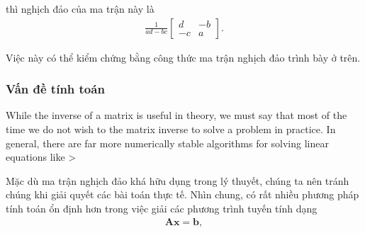 \documentclass[letterpaper,11pt,english]{sphinxmanual}
\begin{document}
thì nghịch đảo của ma trận này là
\begin{equation}\label{equation:chapter_appendix_math/geometry-linear-algebric-ops_vn:chapter_appendix_math/geometry-linear-algebric-ops_vn:21}
\begin{split} \frac{1}{ad-bc}  \begin{bmatrix}
d & -b \\
-c & a
\end{bmatrix}.\end{split}
\end{equation}


Việc này có thể kiểm chứng bằng công thức ma trận nghịch đảo trình bày ở
trên.

\begin{sphinxVerbatim}[commandchars=\\\{\}]
  \PYG{p}{[}\PYG{p}{[} \PYG{p}{]} \PYG{p}{[} \PYG{p}{]}\PYG{p}{]}
  \PYG{p}{[}\PYG{p}{[} \PYG{p}{]} \PYG{p}{[} \PYG{p}{]}\PYG{p}{]}
\end{sphinxVerbatim}








\subsubsection{Vấn đề tính toán}
\label{\detokenize{chapter_appendix_math/geometry-linear-algebric-ops_vn:van-de-tinh-toan}}
While the inverse of a matrix is useful in theory, we must say that most
of the time we do not wish to  the matrix inverse to solve a
problem in practice. In general, there are far more numerically stable
algorithms for solving linear equations like \textendash{}\textgreater{}

Mặc dù ma trận nghịch đảo khá hữu dụng trong lý thuyết, chúng ta nên
tránh  chúng khi giải quyết các bài toán thực tế. Nhìn chung,
có rất nhiều phương pháp tính toán ổn định hơn trong việc giải các
phương trình tuyến tính dạng
\begin{equation}\label{equation:chapter_appendix_math/geometry-linear-algebric-ops_vn:chapter_appendix_math/geometry-linear-algebric-ops_vn:22}
\begin{split}\mathbf{A}\mathbf{x} = \mathbf{b},\end{split}
\end{equation}
\end{document}
